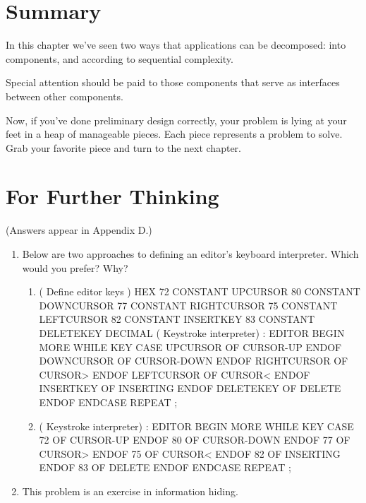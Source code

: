 \section{Summary}

In this chapter we've seen two ways that applications can be
decomposed: into components, and according to sequential complexity.

Special attention should be paid to those components that serve as
interfaces between other components.

Now, if you've done preliminary design correctly, your problem is
lying at your feet in a heap of manageable pieces. Each piece represents a
problem to solve. Grab your favorite piece and turn to the next chapter.

\section{For Further Thinking}

(Answers appear in Appendix D\fixme{}.)

\begin{enumerate}
\item Below are two approaches to defining an editor's keyboard interpreter.
Which would you prefer? Why?

\begin{enumerate}
\item \begin{Code}
( Define editor keys )
HEX
72 CONSTANT UPCURSOR
80 CONSTANT DOWNCURSOR
77 CONSTANT RIGHTCURSOR
75 CONSTANT LEFTCURSOR
82 CONSTANT INSERTKEY
83 CONSTANT DELETEKEY
DECIMAL
( Keystroke interpreter)
: EDITOR
   BEGIN  MORE WHILE  KEY   CASE
      UPCURSOR     OF  CURSOR-UP     ENDOF
      DOWNCURSOR   OF  CURSOR-DOWN   ENDOF
      RIGHTCURSOR  OF  CURSOR>       ENDOF
      LEFTCURSOR   OF  CURSOR<       ENDOF
      INSERTKEY    OF  INSERTING     ENDOF
      DELETEKEY    OF  DELETE        ENDOF
   ENDCASE  REPEAT ;
\end{Code}

\item \begin{Code}
( Keystroke interpreter)
: EDITOR
   BEGIN  MORE WHILE  KEY   CASE
      72 OF  CURSOR-UP     ENDOF
      80 OF  CURSOR-DOWN   ENDOF
      77 OF  CURSOR>       ENDOF
      75 OF  CURSOR<       ENDOF
      82 OF  INSERTING     ENDOF
      83 OF  DELETE        ENDOF
   ENDCASE  REPEAT ;
\end{Code}
\end{enumerate}

\item This problem is an exercise in information hiding.
\end{enumerate}

